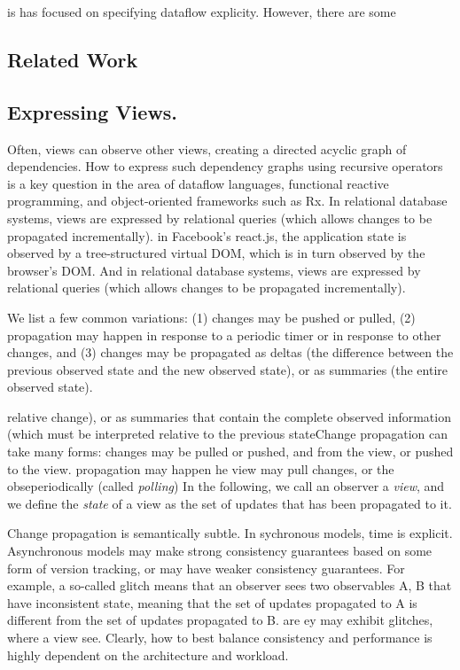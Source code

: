   is has focused on specifying dataflow explicity. However, there are some 


\subsection{Related Work}

\subsection{Expressing Views.} Often, views can observe other views, creating a directed acyclic graph of dependencies. How to express such dependency graphs using recursive operators is a key question in the area of dataflow languages, functional reactive programming, and object-oriented frameworks such as Rx. In relational database systems, views are expressed by relational queries (which allows changes to be propagated incrementally). in Facebook's react.js, the application state is observed by a tree-structured virtual DOM, which is in turn observed by the browser's DOM. And in relational database systems, views are expressed by relational queries (which allows changes to be propagated incrementally). 

We list a few common variations: (1) changes may be pushed or pulled, (2) propagation may happen in response to a periodic timer or in response to other changes, and (3) changes may be propagated as deltas (the difference between the previous observed state and the new observed state), or as summaries (the entire observed state).

  relative change), or as summaries that contain the complete observed information  (which must be interpreted relative to the previous stateChange propagation can take many forms: changes may be pulled or pushed, and from the view, or pushed to the view. propagation may happen he view may pull changes, or the obseperiodically (called \emph{polling}) In the following, we call an observer a \emph{view}, and we define the \emph{state} of a view as the set of updates that has been propagated to it. 




Change propagation is semantically subtle. In sychronous models, time is explicit. Asynchronous models may make strong consistency guarantees based on some form of version tracking, or may have weaker consistency guarantees. For example, a so-called glitch means that an observer sees two observables A, B that have inconsistent state, meaning that the set of updates propagated to A is different from the set of updates propagated to B. are ey may exhibit glitches, where a view see. Clearly, how to best balance consistency and performance is highly dependent on the architecture and workload. 

